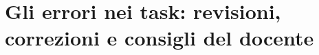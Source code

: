 %
%
%
%

\providecommand{\rvAvviso}{\textbf{[!]}}
\providecommand{\rvBene}{\textbf{[+]}}
\providecommand{\rvAncora}[1]{``\emph{#1}''\,:}
\providecommand{\rvVuoto}{\emph{(riga vuota o spazio)}\,:}
\providecommand{\rvRisposta}[1]{\emph{Commento di #1:}}
\providecommand{\rvPresunto}[1]{[\emph{presumibilmente} ``\emph{#1}'']\,:}

\chapter[Gli errori nei task]{Gli errori nei task: revisioni, correzioni
e consigli del docente}
\label{rv:cap:errori-task}

